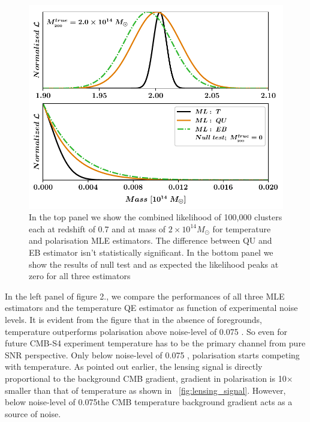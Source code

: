  \begin{figure}
\includegraphics[width=\linewidth, keepaspectratio]{figs/fig0-eps-converted-to.pdf}
 \caption{In the top panel we show the combined likelihood of 100,000 clusters each at redshift of 0.7 and at mass of $2\times 10^{14} M_{\odot}$ for temperature and polarisation MLE estimators. The difference between QU and EB estimator isn't statistically significant. In the bottom panel we show the results of null test and as expected the likelihood peaks at zero for all three estimators}
 \end{figure}
 
 In the left panel of figure 2., we compare the performances of all three MLE estimators and the temperature QE estimator as function of experimental noise levels. 
 It is evident from the figure that in the absence of foregrounds, temperature outperforms polarisation above noise-level of 0.075 \ukam.
 So even for future CMB-S4 experiment temperature has to be the primary channel from pure SNR perspective.
 Only below noise-level of  0.075 \ukam, polarisation starts competing with temperature.
 As pointed out earlier, the lensing signal is directly proportional to the background CMB gradient, gradient in polarisation is 10$\times$ smaller than that of temperature as shown in ~\ref{fig:lensing_signal}. However, below noise-level of 0.075\ukam the CMB temperature background gradient acts as a source of noise. 

